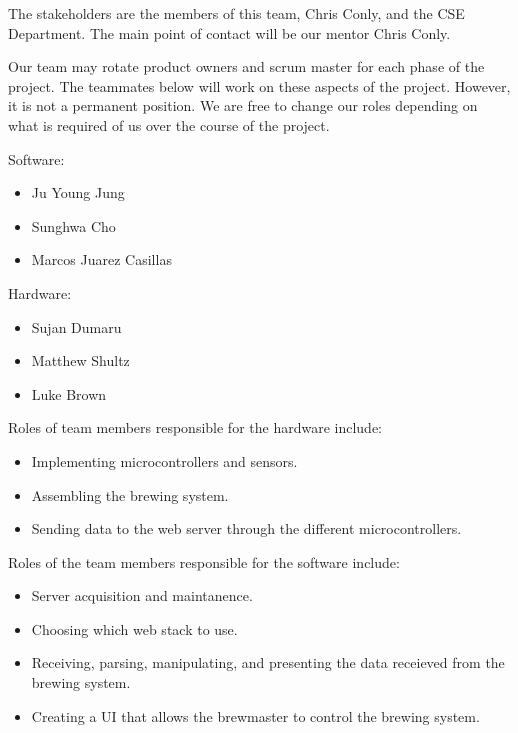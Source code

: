 
The stakeholders are the members of this team, Chris Conly, and the CSE Department. The main point of contact will be our mentor Chris Conly.

Our team may rotate product owners and scrum master for each phase of the project. The teammates below will work on these aspects of the project. However, it is not a permanent position. We are free to change our roles depending on what is required of us over the course of the project.

\vspace{5mm}



Software:

\begin{itemize}
	\item Ju Young Jung
	\item Sunghwa Cho
	\item Marcos Juarez Casillas
	
\end{itemize}

Hardware:

\begin{itemize}
	\item Sujan Dumaru
	\item Matthew Shultz
	\item Luke Brown
	
\end{itemize}

Roles of team members responsible for the hardware include:

\begin{itemize}
	\item Implementing microcontrollers and sensors.
	\item Assembling the brewing system.
	\item Sending data to the web server through the different microcontrollers.
\end{itemize}

Roles of the team members responsible for the software include:

\begin{itemize}
	\item Server acquisition and maintanence.
	\item Choosing which web stack to use.
	\item Receiving, parsing, manipulating, and presenting the data receieved from the brewing system.
	\item Creating a UI that allows the brewmaster to control the brewing system.
\end{itemize}


